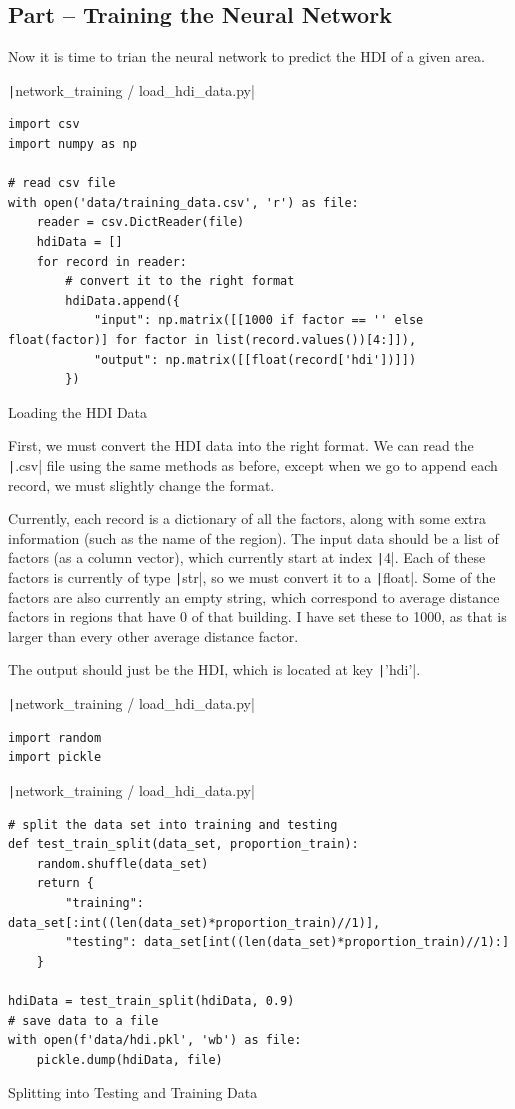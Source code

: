\documentclass[12pt]{report}
\newcommand{\pil}[1]{\protect\texttt|#1|}
\begin{document}
\subsection{Part \theparts{} -- Training the Neural Network}\label{sec:trainNetwork}

Now it is time to trian the neural network to predict the HDI of a given area.

\begin{listing}[H]
\pil{network_training / load_hdi_data.py}
\begin{verbatim}
import csv
import numpy as np

# read csv file
with open('data/training_data.csv', 'r') as file:
    reader = csv.DictReader(file)
    hdiData = []
    for record in reader:
        # convert it to the right format
        hdiData.append({
            "input": np.matrix([[1000 if factor == '' else float(factor)] for factor in list(record.values())[4:]]),
            "output": np.matrix([[float(record['hdi'])]])
        })
\end{verbatim}
\caption{Loading the HDI Data}\label{cs:loadHDIdata}
\end{listing}

First, we must convert the HDI data into the right format. We can read the \pil{.csv} file using the same methods as before, except when we go to append each record, we must slightly change the format.

Currently, each record is a dictionary of all the factors, along with some extra information (such as the name of the region). The input data should be a list of factors (as a column vector), which currently start at index \pil{4}. Each of these factors is currently of type \pil{str}, so we must convert it to a \pil{float}. Some of the factors are also currently an empty string, which correspond to average distance factors in regions that have 0 of that building. I have set these to 1000, as that is larger than every other average distance factor.

The output should just be the HDI, which is located at key \pil{'hdi'}.

\begin{listing}[H]
\pil{network_training / load_hdi_data.py}
\begin{verbatim}
import random
import pickle
\end{verbatim}
\pil{network_training / load_hdi_data.py}
\begin{verbatim}
# split the data set into training and testing
def test_train_split(data_set, proportion_train):
    random.shuffle(data_set)
    return {
        "training": data_set[:int((len(data_set)*proportion_train)//1)],
        "testing": data_set[int((len(data_set)*proportion_train)//1):]
    }

hdiData = test_train_split(hdiData, 0.9)
# save data to a file
with open(f'data/hdi.pkl', 'wb') as file:
    pickle.dump(hdiData, file)
\end{verbatim}
\caption{Splitting into Testing and Training Data}\label{cs:testTrainSplit}
\end{listing}
\end{document}
